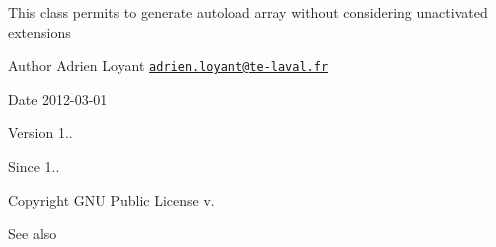This class permits to generate autoload array without considering unactivated extensions

\begin{DoxyAuthor}{Author}
Adrien Loyant \href{mailto:adrien.loyant@te-laval.fr}{\tt adrien.\-loyant@te-\/laval.\-fr}
\end{DoxyAuthor}
\begin{DoxyDate}{Date}
2012-\/03-\/01 
\end{DoxyDate}
\begin{DoxyVersion}{Version}
1.. 
\end{DoxyVersion}
\begin{DoxySince}{Since}
1.. 
\end{DoxySince}
\begin{DoxyCopyright}{Copyright}
G\-N\-U Public License v.
\end{DoxyCopyright}
\begin{DoxySeeAlso}{See also}

\end{DoxySeeAlso}
